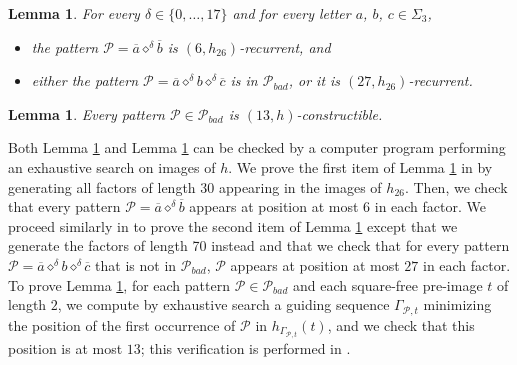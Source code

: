 \documentclass[12pt]{article}
\newtheorem{lemma}[theorem]{Lemma}
\theoremstyle{definition}
\newcommand{\patternprime}[3]{{#1}\diamond^{#2}{#3}}
\begin{document}
\begin{lemma}\label{lemma:pattern!a<-d->!b_distance_and_pattern!a<-d->b<-d->!c_distance} 
    For every $\delta \in \{0,\dots, 17\}$ and for every letter $a$, $b$, $c \in \Sigma_3$, 
    \begin{itemize}
        \item the pattern $\mathcal{P} = \patternprime{\overline{a}}{\delta}{\overline{b}}$ is $(6, h_{26})$-recurrent, and
        \item either the pattern $\mathcal{P} = \patternprime{\overline{a}}{\delta}{b}\patternprime{}{\delta}{\overline{c}}$ is in  $\mathcal{P}_{bad}$, or it is $(27, h_{26})$-recurrent.
    \end{itemize}
\end{lemma}

\begin{lemma}\label{lemma:Mbad_patterns_are_13_h_constructible}
    Every pattern $\mathcal{P} \in \mathcal{P}_{bad}$ is $(13, h)$-constructible.
\end{lemma}

Both Lemma \ref{lemma:pattern!a<-d->!b_distance_and_pattern!a<-d->b<-d->!c_distance} and Lemma \ref{lemma:Mbad_patterns_are_13_h_constructible}
can be checked by a computer program performing an exhaustive search on images of $h$. We prove the first item of Lemma \ref{lemma:pattern!a<-d->!b_distance_and_pattern!a<-d->b<-d->!c_distance} in \cite[lemma\_\ref{lemma:pattern!a<-d->!b_distance_and_pattern!a<-d->b<-d->!c_distance}\_i.cpp]{code} by generating all factors of length $30$ appearing in the images of $h_{26}$. Then, we check that every pattern $\mathcal{P} = \patternprime{\overline{a}}{\delta}{\overline{b}}$ appears at position at most $6$ in each factor. We proceed similarly in \cite[lemma\_\ref{lemma:pattern!a<-d->!b_distance_and_pattern!a<-d->b<-d->!c_distance}\_ii.cpp]{code} to prove the second item of Lemma \ref{lemma:pattern!a<-d->!b_distance_and_pattern!a<-d->b<-d->!c_distance} except that we generate the factors of length 70 instead and that we check that for every pattern $\mathcal{P} = \patternprime{\overline{a}}{\delta}{b}\patternprime{}{\delta}{\overline{c}}$ that is not in  $\mathcal{P}_{bad}$, $\mathcal{P}$ appears at position at most $27$ in each factor.
To prove Lemma \ref{lemma:Mbad_patterns_are_13_h_constructible}, for each pattern $\mathcal{P} \in \mathcal{P}_{bad}$ and each square-free pre-image $t$ of length $2$, we compute by exhaustive search a guiding sequence $\Gamma_{\mathcal{P}, t}$ minimizing the position of the first occurrence of $\mathcal{P}$ in $h_{\Gamma_{\mathcal{P}, t}}(t)$, and we check that this position is at most $13$; this verification is performed in \cite[lemma\_\ref{lemma:Mbad_patterns_are_13_h_constructible}.cpp]{code}.
\end{document}
